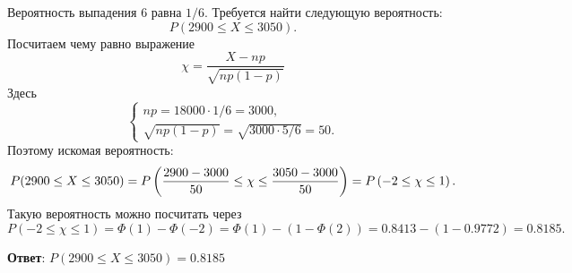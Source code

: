\documentclass{article}
\begin{document}
\begin{enumerate}
    Вероятность выпадения 6 равна $1/6$. Требуется найти следующую вероятность:
    \begin{equation}
        P(2900 \leq X \leq 3050).
    \end{equation}
    Посчитаем чему равно выражение
    $$\chi = \frac{X-np}{\sqrt{np(1-p)}}$$
    Здесь
    \begin{equation}
        \begin{cases}
            np = 18000 \cdot 1/6 = 3000,\\
            \sqrt{np(1-p)} = \sqrt{3000\cdot5/6} = 50.
        \end{cases}
    \end{equation}
    Поэтому искомая вероятность:
    \begin{equation}
        P(2900 \leq X \leq 3050) = P\left(\frac{2900 - 3000}{50} \leq \chi \leq \frac{3050 - 3000}{50}\right) = \\
        P\left(-2 \leq \chi \leq 1\right).
    \end{equation}
    Такую вероятность можно посчитать через
    \begin{equation}
        P\left(-2 \leq \chi \leq 1\right) = \Phi(1) - \Phi(-2) = \Phi(1) - (1 - \Phi(2)) = 0.8413 - (1 - 0.9772) = 0.8185.
    \end{equation}

    \textbf{Ответ}:
    $P(2900 \leq X \leq 3050) = 0.8185$
    
    
\end{enumerate}

  
\end{document}
